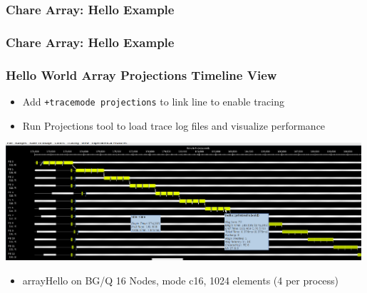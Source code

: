 \begin{frame}[fragile]
  \frametitle{Chare Array: Hello Example }
  
\end{frame}

\begin{frame}[fragile]
  \frametitle{Chare Array: Hello Example }
  
\end{frame}

\begin{frame}[fragile]
   \frametitle{Hello World Array Projections Timeline View}\scriptsize
  \begin{itemize}
    \item Add \texttt{+tracemode projections} to link line to enable tracing
    \item Run Projections tool to load trace log files and visualize performance
  \end{itemize}
  \begin{center} \includegraphics[width=0.99\textwidth]{figures/arrayHelloTimeline} \end{center}
  \begin{itemize}
   \item arrayHello on BG/Q 16 Nodes, mode c16, 1024 elements (4 per process)
  \end{itemize}
\end{frame}


